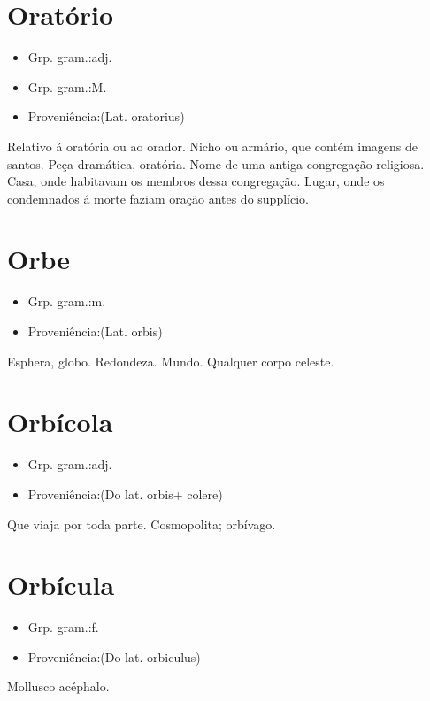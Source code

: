 \section{Oratório}
\begin{itemize}
\item {Grp. gram.:adj.}
\end{itemize}
\begin{itemize}
\item {Grp. gram.:M.}
\end{itemize}
\begin{itemize}
\item {Proveniência:(Lat. \textunderscore oratorius\textunderscore )}
\end{itemize}
Relativo á oratória ou ao orador.
Nicho ou armário, que contém imagens de santos.
Peça dramática, oratória.
Nome de uma antiga congregação religiosa.
Casa, onde habitavam os membros dessa congregação.
Lugar, onde os condemnados á morte faziam oração antes do supplício.
\section{Orbe}
\begin{itemize}
\item {Grp. gram.:m.}
\end{itemize}
\begin{itemize}
\item {Proveniência:(Lat. \textunderscore orbis\textunderscore )}
\end{itemize}
Esphera, globo.
Redondeza.
Mundo.
Qualquer corpo celeste.
\section{Orbícola}
\begin{itemize}
\item {Grp. gram.:adj.}
\end{itemize}
\begin{itemize}
\item {Proveniência:(Do lat. \textunderscore orbis\textunderscore  + \textunderscore colere\textunderscore )}
\end{itemize}
Que viaja por toda parte.
Cosmopolita; orbívago.
\section{Orbícula}
\begin{itemize}
\item {Grp. gram.:f.}
\end{itemize}
\begin{itemize}
\item {Proveniência:(Do lat. \textunderscore orbiculus\textunderscore )}
\end{itemize}
Mollusco acéphalo.
